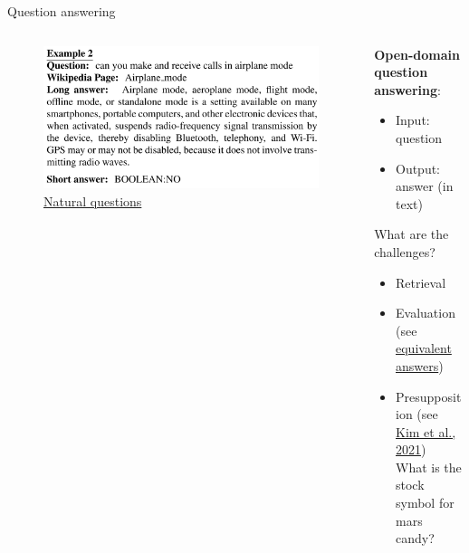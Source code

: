 \documentclass[usenames,dvipsnames,notes,11pt,aspectratio=169,hyperref={colorlinks=true, linkcolor=blue}]{beamer}
\newcommand{\pdfnote}[1]{}
\begin{document}
\begin{frame}
    {Question answering}
    \begin{columns}
        \begin{column}{0.5\textwidth}
            \begin{figure}
                \includegraphics[height=0.5\textwidth]{figures/nq}
                \caption{\href{https://aclanthology.org/Q19-1026.pdf}{Natural questions}}
            \end{figure}
        \end{column}
        \begin{column}{0.5\textwidth}
            \textbf{Open-domain question answering}:\\
            \begin{itemize}
                \item[] Input: question
                \item[] Output: answer (in text)
            \end{itemize}

            \bigskip
            What are the challenges?\\
            \begin{itemize}
                \item Retrieval
                \item Evaluation (see \href{https://arxiv.org/abs/2109.05289}{equivalent answers})
                \item Presupposition (see \href{https://aclanthology.org/2021.acl-long.304.pdf}{Kim et al., 2021})\\
                    What is the stock symbol for mars candy?
                    \pdfnote{mars is not a publicly traded company}
            \end{itemize}
        \end{column}
    \end{columns}
\end{frame}
\end{document}

